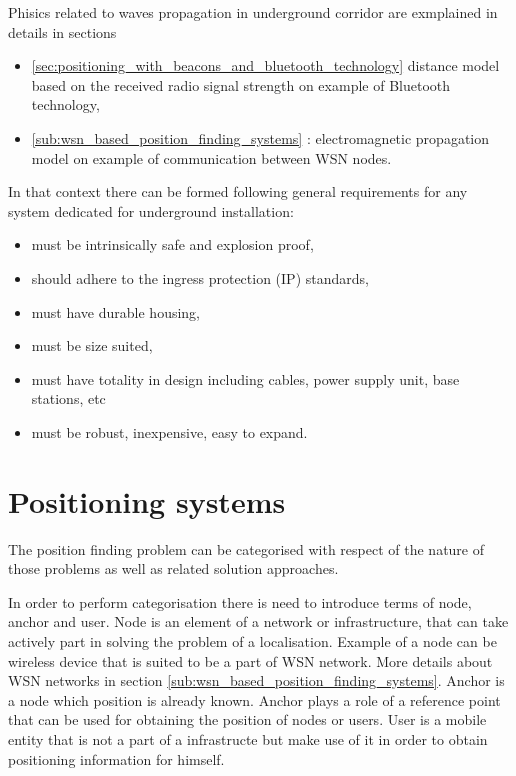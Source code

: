 \documentclass[../main.tex]{subfiles}
\begin{document}
Phisics related to waves propagation in underground corridor are exmplained in details in sections
\begin{itemize}
	\item \ref{sec:positioning_with_beacons_and_bluetooth_technology} distance model based on the received radio signal strength on example of Bluetooth technology,
	\item \ref{sub:wsn_based_position_finding_systems} : electromagnetic propagation model on example of communication between WSN nodes.
\end{itemize}

In that context there can be formed following general requirements for any system dedicated for underground installation\cite{Book_wireless_in_mines}:
\begin{itemize}
	\item must be intrinsically safe and explosion proof,
	\item should adhere to the ingress protection (IP) standards,
	\item must have durable housing,
	\item must be size suited,
	\item must have totality in design including cables, power supply unit, base stations, etc
	\item must be robust, inexpensive, easy to expand.
\end{itemize}



\section{Positioning systems}

The position finding problem can be categorised with respect of the nature of those problems as well as related solution approaches.

In order to perform categorisation there is need to introduce terms of node, anchor and user. Node is an element of a network or infrastructure, that can take actively part in solving the problem of a localisation. Example of a node can be wireless device that is suited to be a part of WSN network. More details about WSN networks in section \ref{sub:wsn_based_position_finding_systems}. Anchor is a node which position is already known. Anchor plays a role of a reference point that can be used for obtaining the position of nodes or users. User is a mobile entity that is not a part of a infrastructe but make use of it in order to obtain positioning information for himself.
\end{document}
